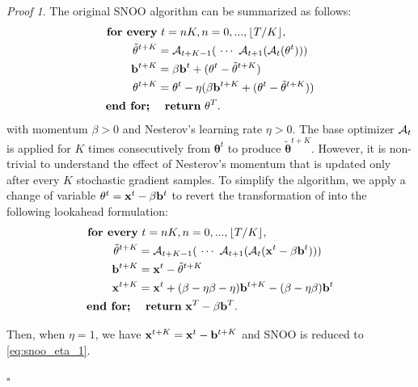 \documentclass{article}
\theoremstyle{plain}
\theoremstyle{definition}
\theoremstyle{remark}
\newtheorem{prooft}{Proof}
\def\bx{\mathbf{x}}
\def\btheta{\mathbf{\theta}}
\begin{document}
\begin{prooft} \label{proof:snoo_reduction}
    The original SNOO algorithm can be summarized as follows:
    \begin{equation} 
    \begin{aligned}
    \textbf{for every}&~ t=nK, n = 0, ..., \lfloor T/K \rfloor,\\
        \tilde{\btheta}^{t+K} &= {\cal A}_{t+K-1}(~\cdots ~{\cal A}_{t+1}( {\cal A}_t(\btheta^t) ) ) \\
        {\bf b}^{t+K} &= \beta {\bf b}^t + (\btheta^{t} - \tilde{\btheta}^{t+K}) \\
        \btheta^{t+K} &= \btheta^t - \eta (\beta {\bf b}^{t+K} +  (\btheta^{t} - \tilde{\btheta}^{t+K})) \\
    \textbf{end for;}~~&~~\textbf{return}~\btheta^T.
    \end{aligned}
\end{equation}
with momentum $\beta >0$ and Nesterov's learning rate $\eta > 0$. The base optimizer ${\cal A}_t$ is applied for $K$ times consecutively from $\btheta^t$ to produce $\tilde{\btheta}^{t+K}$. However, it is non-trivial to understand the effect of Nesterov's momentum that is updated only after every $K$ stochastic gradient samples. To simplify the algorithm, we apply a change of variable $\btheta^t = \bx^t - \beta {\bf b}^t$ to revert the transformation of \cite{sutskever2013importance} into the following lookahead formulation:
\begin{equation} 
    \begin{aligned}
    \textbf{for every}&~ t=nK, n = 0, ..., \lfloor T/K \rfloor,\\
        \tilde{\btheta}^{t+K} &= {\cal A}_{t+K-1}(~\cdots ~{\cal A}_{t+1}( {\cal A}_t(\bx^t - \beta {\bf b}^t) ) ) \\
        {\bf b}^{t+K} &=  \bx^{t} - \tilde{\btheta}^{t+K} \\
        \bx^{t+K} &= \bx^t + (\beta - \eta \beta- \eta) {\bf b}^{t+K} - (\beta - \eta \beta ){\bf b}^t\\
    \textbf{end for;}~~&~~\textbf{return}~\bx^T - \beta {\bf b}^T.
    \end{aligned}
\end{equation}

Then, when $\eta = 1$, we have $\bx^{t+K} = \bx^t - {\bf b}^{t+K}$ and SNOO is reduced to \eqref{eq:snoo_eta_1}.

\hfill $\square$
\end{prooft}
\end{document}
